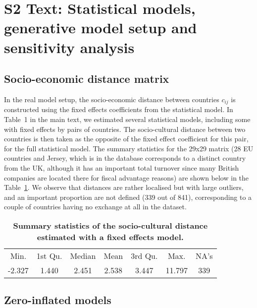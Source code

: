 

\renewcommand{\thetable}{S2-\Alph{table}}


\vspace*{0.35in}
\justify

\section*{S2 Text: Statistical models, generative model setup and sensitivity analysis}


\subsection*{Socio-economic distance matrix}

In the real model setup, the socio-economic distance between countries $c_{ij}$ is constructed using the fixed effects coefficients from the statistical model. In Table~1 in the main text, we estimated several statistical models, including some with fixed effects by pairs of countries. The socio-cultural distance between two countries is then taken as the opposite of the fixed effect coefficient for this pair, for the full statistical model. The summary statistics for the 29x29 matrix (28 EU countries and Jersey, which is in the database corresponds to a distinct country from the UK, although it has an important total turnover since many British companies are located there for fiscal advantage reasons) are shown below in the Table~\ref{tab:fixedeff}. We observe that distances are rather localised but with large outliers, and an important proportion are not defined (339 out of 841), corresponding to a couple of countries having no exchange at all in the dataset.

\begin{table}[h!]
\caption{\textbf{Summary statistics of the socio-cultural distance estimated with a fixed effects model.}\label{tab:fixedeff}}
\begin{tabular}{ccccccc}
   Min. & 1st Qu. &  Median &  Mean &  3rd Qu. &  Max. &  NA's \\
 -2.327 &  1.440 &  2.451 &  2.538 &  3.447 & 11.797 &  339 
\end{tabular}
\end{table}



\subsection*{Zero-inflated models}

